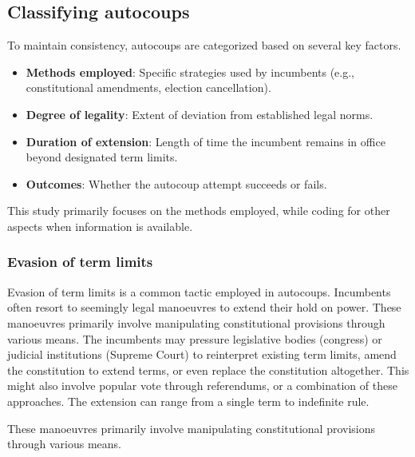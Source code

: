 \documentclass[
  12pt,
]{report}
\begin{document}
\subsection{Classifying autocoups}\label{sec-classify}

To maintain consistency, autocoups are categorized based on several key
factors.

\begin{itemize}
\item
  \textbf{Methods employed}: Specific strategies used by incumbents
  (e.g., constitutional amendments, election cancellation).
\item
  \textbf{Degree of legality}: Extent of deviation from established
  legal norms.
\item
  \textbf{Duration of extension}: Length of time the incumbent remains
  in office beyond designated term limits.
\item
  \textbf{Outcomes}: Whether the autocoup attempt succeeds or fails.
\end{itemize}

This study primarily focuses on the methods employed, while coding for
other aspects when information is available.

\subsubsection*{Evasion of term limits}\label{evasion-of-term-limits}

Evasion of term limits is a common tactic employed in autocoups.
Incumbents often resort to seemingly legal manoeuvres to extend their
hold on power. These manoeuvres primarily involve manipulating
constitutional provisions through various means. The incumbents may
pressure legislative bodies (congress) or judicial institutions (Supreme
Court) to reinterpret existing term limits, amend the constitution to
extend terms, or even replace the constitution altogether. This might
also involve popular vote through referendums, or a combination of these
approaches. The extension can range from a single term to indefinite
rule.

These manoeuvres primarily involve manipulating constitutional
provisions through various means.
\end{document}
